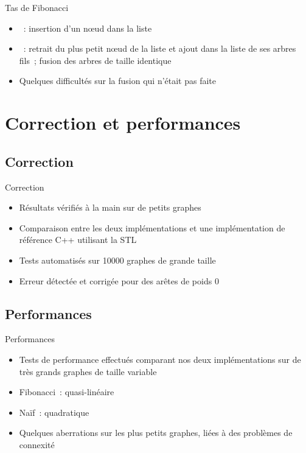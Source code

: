 \documentclass[11pt]{beamer}
\begin{document}
\begin{frame}{Tas de Fibonacci}
\begin{itemize}
\item {}~: insertion d'un n\oe ud dans la liste
\item {}~: retrait du plus petit n\oe ud de la liste et ajout dans la liste de ses arbres fils~; fusion des arbres de taille identique
\item Quelques difficultés sur la fusion qui n'était pas faite
\end{itemize}
\end{frame}

\section{Correction et performances}

\subsection{Correction}

\begin{frame}{Correction}
\begin{itemize}
\item Résultats vérifiés à la main sur de petits graphes
\item Comparaison entre les deux implémentations et une implémentation de référence C++ utilisant la STL
\item Tests automatisés sur 10000 graphes de grande taille
\item Erreur détectée et corrigée pour des arêtes de poids 0
\end{itemize}
\end{frame}

\subsection{Performances}

\begin{frame}{Performances}
\begin{itemize}
\item Tests de performance effectués comparant nos deux implémentations sur de très grands graphes de taille variable
\item Fibonacci~: quasi-linéaire
\item Naïf~: quadratique
\item Quelques aberrations sur les plus petits graphes, liées à des problèmes de connexité
\end{itemize}
\end{frame}
\end{document}
